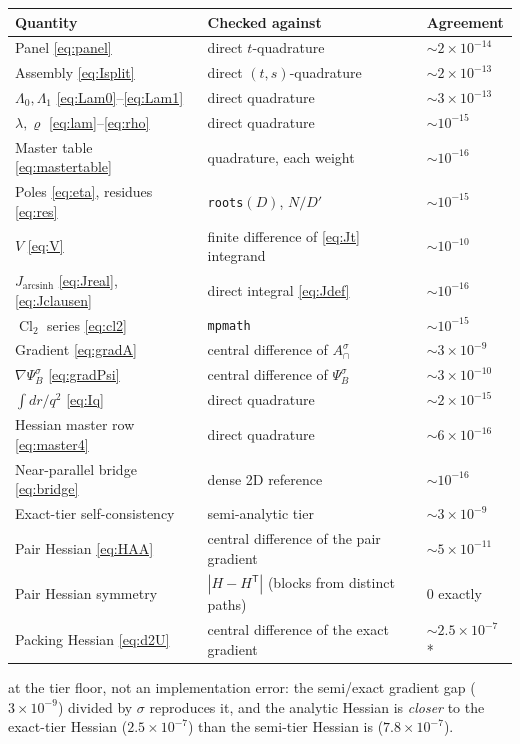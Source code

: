 \documentclass[11pt]{article}
\numberwithin{equation}{section}
\DeclareMathOperator{\arcsinh}{arcsinh}
\DeclareMathOperator{\Cl}{Cl}
\begin{document}
\begin{center}
\begin{tabular}{lll}
\hline
Quantity & Checked against & Agreement\\
\hline
Panel \eqref{eq:panel} & direct $t$-quadrature & $\sim2\times10^{-14}$\\
Assembly \eqref{eq:Isplit} & direct $(t,s)$-quadrature & $\sim2\times10^{-13}$\\
$\Lambda_0,\Lambda_1$ \eqref{eq:Lam0}--\eqref{eq:Lam1} & direct quadrature & $\sim3\times10^{-13}$\\
$\lambda,\varrho$ \eqref{eq:lam}--\eqref{eq:rho} & direct quadrature & $\sim10^{-15}$\\
Master table \eqref{eq:mastertable} & quadrature, each weight & $\sim10^{-16}$\\
Poles \eqref{eq:eta}, residues \eqref{eq:res} & \texttt{roots}$(D)$, $N/D'$ & $\sim10^{-15}$\\
$V$ \eqref{eq:V} & finite difference of \eqref{eq:Jt} integrand & $\sim10^{-10}$\\
$J_{\arcsinh}$ \eqref{eq:Jreal}, \eqref{eq:Jclausen} & direct integral \eqref{eq:Jdef} & $\sim10^{-16}$\\
$\Cl_2$ series \eqref{eq:cl2} & \texttt{mpmath} & $\sim10^{-15}$\\
Gradient \eqref{eq:gradA} & central difference of $A_\cap^\sigma$ & $\sim3\times10^{-9}$\\
$\nabla\Psi_B^\sigma$ \eqref{eq:gradPsi} & central difference of $\Psi_B^\sigma$ & $\sim3\times10^{-10}$\\
$\int dr/q^2$ \eqref{eq:Iq} & direct quadrature & $\sim2\times10^{-15}$\\
Hessian master row \eqref{eq:master4} & direct quadrature & $\sim6\times10^{-16}$\\
Near-parallel bridge \eqref{eq:bridge} & dense 2D reference & $\sim10^{-16}$\\
Exact-tier self-consistency & semi-analytic tier & $\sim3\times10^{-9}$\\
Pair Hessian \eqref{eq:HAA} & central difference of the pair gradient & $\sim5\times10^{-11}$\\
Pair Hessian symmetry & $|H-H^{\mathsf T}|$ (blocks from distinct paths) & $0$ exactly\\
Packing Hessian \eqref{eq:d2U} & central difference of the exact gradient & $\sim2.5\times10^{-7}$*\\
\hline
\end{tabular}
\end{center}
\noindent *at the tier floor, not an implementation error: the semi/exact gradient gap
($3\times10^{-9}$) divided by $\sigma$ reproduces it, and the analytic Hessian is \emph{closer} to the
exact-tier Hessian ($2.5\times10^{-7}$) than the semi-tier Hessian is ($7.8\times10^{-7}$).
\end{document}
